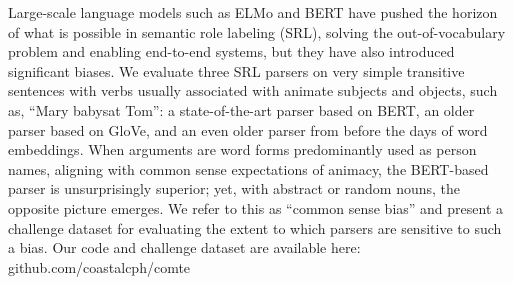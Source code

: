 Large-scale language models such as ELMo and BERT have pushed the horizon of what is possible in semantic role labeling (SRL), solving the out-of-vocabulary problem and enabling end-to-end systems, but they have also introduced significant biases. We evaluate three SRL parsers on very simple transitive sentences with verbs usually associated with animate subjects and objects, such as, ``Mary babysat Tom'': a state-of-the-art parser based on BERT, an older parser based on GloVe, and an even older parser from before the days of word embeddings. When arguments are word forms predominantly used as person names, aligning with common sense expectations of animacy, the BERT-based parser is unsurprisingly superior; yet, with abstract or random nouns, the opposite picture emerges. We refer to this as ``common sense bias'' and present a challenge dataset for evaluating the extent to which parsers are sensitive to such a bias. Our code and challenge dataset are available here: github.com/coastalcph/comte
